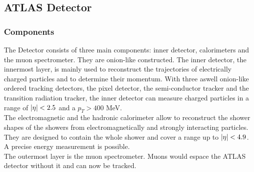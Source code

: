 \documentclass[12pt, a4paper, bibliography=totoc]{scrartcl}
\begin{document}
\begin{multicols}{2}
\subsection{ATLAS Detector}
\subsubsection{Components}
The Detector consists of three main components: inner detector, calorimeters and the muon spectrometer.
They are onion-like constructed. 
The inner detector, the innermost layer, is mainly used to reconstruct the trajectories of electrically charged particles and to determine their momentum. 
With three aswell onion-like ordered tracking detectors, the pixel detector, the semi-conductor tracker and the transition radiation tracker, the inner detector can measure charged particles in a range of $\abs{\eta} < 2.5$ and a $p_{T} > 400$ \si{MeV}.\\

The electromagnetic and the hadronic calorimeter allow to reconstruct the shower shapes of the showers from electromagnetically and strongly interacting particles. 
They are designed to contain the whole shower and cover a range up to $\abs{\eta} < 4.9$. 
A precise energy measurement is possible.\\
The outermost layer is the muon spectrometer.
Muons would espace the ATLAS detector without it and can now be tracked. 


\end{multicols}
\end{document}
